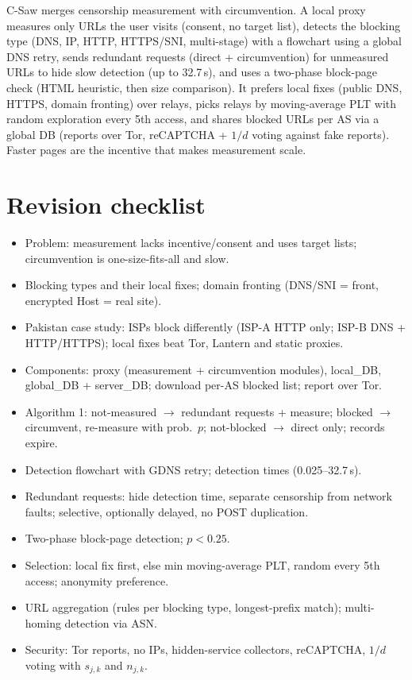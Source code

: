 \begin{keybox}
C-Saw merges censorship measurement with circumvention. A local proxy measures only URLs the user visits (consent, no target list), detects the blocking type
(DNS, IP, HTTP, HTTPS/SNI, multi-stage) with a flowchart using a global DNS retry, sends redundant requests (direct + circumvention) for unmeasured URLs to hide
slow detection (up to 32.7\,s), and uses a two-phase block-page check (HTML heuristic, then size comparison). It prefers local fixes (public DNS, HTTPS, domain
fronting) over relays, picks relays by moving-average PLT with random exploration every 5th access, and shares blocked URLs per AS via a global DB (reports over
Tor, reCAPTCHA + $1/d$ voting against fake reports). Faster pages are the incentive that makes measurement scale.
\end{keybox}

\section{Revision checklist}
\begin{itemize}
  \item Problem: measurement lacks incentive/consent and uses target lists; circumvention is one-size-fits-all and slow.
  \item Blocking types and their local fixes; domain fronting (DNS/SNI = front, encrypted Host = real site).
  \item Pakistan case study: ISPs block differently (ISP-A HTTP only; ISP-B DNS + HTTP/HTTPS); local fixes beat Tor, Lantern and static proxies.
  \item Components: proxy (measurement + circumvention modules), local\_DB, global\_DB + server\_DB; download per-AS blocked list; report over Tor.
  \item Algorithm 1: not-measured $\to$ redundant requests + measure; blocked $\to$ circumvent, re-measure with prob.\ $p$; not-blocked $\to$ direct only; records expire.
  \item Detection flowchart with GDNS retry; detection times (0.025--32.7\,s).
  \item Redundant requests: hide detection time, separate censorship from network faults; selective, optionally delayed, no POST duplication.
  \item Two-phase block-page detection; $p < 0.25$.
  \item Selection: local fix first, else min moving-average PLT, random every 5th access; anonymity preference.
  \item URL aggregation (rules per blocking type, longest-prefix match); multi-homing detection via ASN.
  \item Security: Tor reports, no IPs, hidden-service collectors, reCAPTCHA, $1/d$ voting with $s_{j,k}$ and $n_{j,k}$.
\end{itemize}
